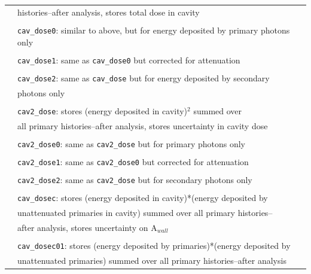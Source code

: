 \documentclass[12pt,twoside]{article}  %
\begin{document}
\begin{longtable}{lll}
          & \multicolumn{2}{l}{histories--after analysis, stores total dose in cavity}\\
         &                        &\\
         & \multicolumn{2}{l}{{\tt cav\_dose0}: similar to above, but for energy deposited by primary photons only}\\
         &                        &\\
         & \multicolumn{2}{l}{{\tt cav\_dose1}: same as {\tt cav\_dose0} but corrected for attenuation}\\
         &                       &\\
         & \multicolumn{2}{l}{{\tt cav\_dose2}: same as {\tt cav\_dose} but for
energy deposited by secondary}\\
         & \multicolumn{2}{l}{photons only}\\
         &      &\\
         & \multicolumn{2}{l}{{\tt cav2\_dose}: stores (energy deposited in cavity)$^2$ summed over}\\
         & \multicolumn{2}{l}{all primary histories--after analysis, stores uncertainty in cavity dose}\\
         &                        &\\
         & \multicolumn{2}{l}{{\tt cav2\_dose0}: same as {\tt cav2\_dose} but for primary photons only}\\
         &                        &\\
         & \multicolumn{2}{l}{{\tt cav2\_dose1}: same as {\tt cav2\_dose0} but corrected for attenuation}\\
          &&\\
         & \multicolumn{2}{l}{{\tt cav2\_dose2}: same as {\tt cav2\_dose} but for secondary photons only}\\
         &&\\
         & \multicolumn{2}{l}{{\tt cav\_dosec}: stores (energy deposited in cavity)*(energy deposited by}\\
         &\multicolumn{2}{l}{unattenuated primaries in cavity) summed over all primary histories--}\\
         &\multicolumn{2}{l}{after analysis, stores uncertainty on A$_{wall}$}\\
         &&\\
         & \multicolumn{2}{l}{{\tt cav\_dosec01}: stores (energy deposited by primaries)*(energy deposited by}\\
         & \multicolumn{2}{l}{unattenuated primaries) summed over all primary histories--after analysis}\\

\end{longtable}
\end{document}
